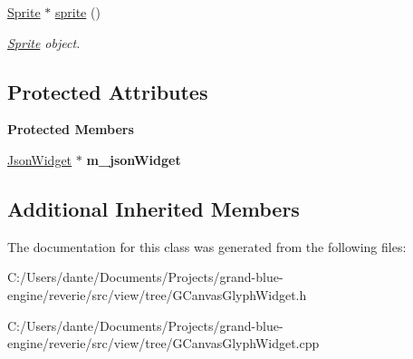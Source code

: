 \begin{Indent}
\begin{DoxyCompactItemize}
\mbox{\label{classrev_1_1_view_1_1_sprite_widget_af238328cac6bc8c54ed7e17ae4c46d7c}} 
\mbox{\hyperlink{classrev_1_1_sprite}{Sprite}} $\ast$ \mbox{\hyperlink{classrev_1_1_view_1_1_sprite_widget_af238328cac6bc8c54ed7e17ae4c46d7c}{sprite}} ()
\begin{DoxyCompactList}\small\item\em \mbox{\hyperlink{classrev_1_1_sprite}{Sprite}} object. \end{DoxyCompactList}\end{DoxyCompactItemize}
\end{Indent}
\subsection*{Protected Attributes}
\begin{Indent}\textbf{ Protected Members}\par
\begin{DoxyCompactItemize}
\item 
\mbox{\label{classrev_1_1_view_1_1_sprite_widget_a9bb1f6dafed1cbda51e91af117d33b1a}} 
\mbox{\hyperlink{classrev_1_1_view_1_1_json_widget}{Json\+Widget}} $\ast$ {\bfseries m\+\_\+json\+Widget}
\end{DoxyCompactItemize}
\end{Indent}
\subsection*{Additional Inherited Members}


The documentation for this class was generated from the following files\+:\begin{DoxyCompactItemize}
\item 
C\+:/\+Users/dante/\+Documents/\+Projects/grand-\/blue-\/engine/reverie/src/view/tree/G\+Canvas\+Glyph\+Widget.\+h\item 
C\+:/\+Users/dante/\+Documents/\+Projects/grand-\/blue-\/engine/reverie/src/view/tree/G\+Canvas\+Glyph\+Widget.\+cpp\end{DoxyCompactItemize}
